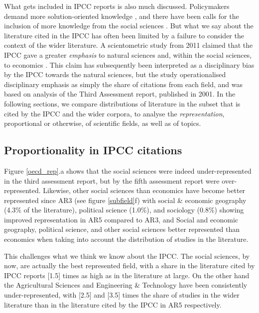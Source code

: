 \documentclass{article}
\begin{document}
\begin{linenumbers}
What gets included in IPCC reports is also much discussed. Policymakers demand more solution-oriented knowledge \cite{Kowarsch2017}, and there have been calls for the inclusion of more knowledge from the social sciences \cite{Victor2015}. But what we say about the literature cited in the IPCC has often been limited by a failure to consider the context of the wider literature. 
A scientometric study from 2011 claimed that the IPCC gave a greater \textit{emphasis} to natural sciences and, within the social sciences, to economics \cite{Bjurström2011}. This claim has subsequently been interpreted as a disciplinary bias by the IPCC \cite{Hulme2010, Corbera2016} towards the natural sciences, but the study operationalised disciplinary emphasis as simply the share of citations from each field, and was based on analysis of the Third Assessment report, published in 2001. In the following sections, we compare distributions of literature in the subset that is cited by the IPCC and the wider corpora, to analyse the \textit{representation}, proportional or otherwise, of scientific fields, as well as of topics.

\subsection*{Proportionality in IPCC citations}


Figure \ref{oecd_rep}.a shows that the social sciences were indeed under-represented in the third assessment report, but by the fifth assessment report were over-represented. Likewise, other social sciences than economics have become better represented since AR3  (see figure \ref{subfield}f) with social \& economic geography (4.3\% of the literature), political science (1.0\%), and sociology (0.8\%) showing improved representation in AR5 compared to AR3, and Social and economic geography, political science, and other social sciences better represented than economics when taking into account the distribution of studies in the literature. 

This challenges what we think we know about the IPCC. The social sciences, by now, are actually the best represented field, with a share in the literature cited by IPCC reports [1.5] times as high as in the literature at large.  On the other hand the Agricultural Sciences and Engineering \& Technology have been consistently under-represented, with [2.5] and [3.5] times the share of studies in the wider literature than in the literature cited by the IPCC in AR5 respectively. %


\end{linenumbers}
\end{document}

